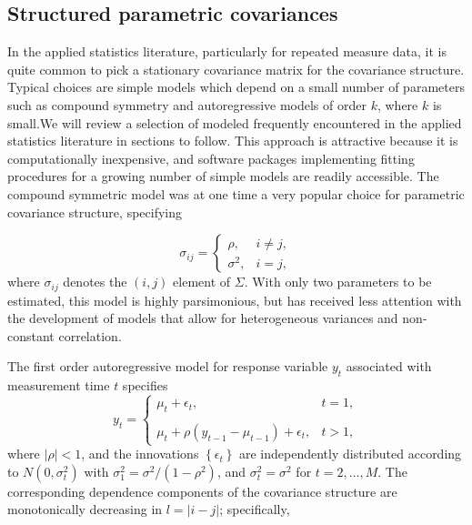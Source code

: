 \subsection{Structured parametric covariances}


In the applied statistics literature, particularly for repeated measure data, it is quite common to pick a stationary covariance matrix for the covariance structure. Typical choices are simple models which depend on a small number of parameters such as compound symmetry and autoregressive models of order $k$, where $k$ is small.We will review a selection of modeled frequently encountered in the applied statistics literature in sections to follow. This approach is attractive because it is computationally inexpensive, and software packages implementing fitting procedures for a growing number of simple models are readily accessible. The compound symmetric model was at one time a very popular choice for parametric covariance structure, specifying

\begin{equation}\label{eq:compound-symmetric-model}
\sigma_{ij} = \left\{ \begin{array}{lr}
\rho, & i \ne j,\\
\sigma^2, & i = j, 
\end{array}\right.
\end{equation}
\noindent
where $\sigma_{ij}$ denotes the $\left(i,j\right)$ element of $\Sigma$. With only two parameters to be estimated, this model is highly parsimonious, but has received less attention with the development of models that allow for heterogeneous variances and non-constant correlation. 

\bigskip

The first order autoregressive model for response variable $y_t$ associated with measurement time $t$ specifies
\begin{equation}\label{eq:ar-1-model}
y_{t} = \left\{ \begin{array}{lr}
\mu_t + \epsilon_t, & t = 1,\\
& \\
\mu_t + \rho\left(y_{t-1} - \mu_{t-1}\right) + \epsilon_t, & t > 1,
\end{array}\right.
\end{equation}
\bigskip
\noindent 
where $\vert \rho \vert < 1$, and the innovations $\left\{\epsilon_t\right\}$ are independently distributed according to $N\left(0,\sigma_t^2\right)$ with $\sigma_1^2 = \sigma^2/\left(1-\rho^2\right)$, and $\sigma_t^2 = \sigma^2$ for $t = 2, \dots, M$. The corresponding dependence components of the covariance structure are monotonically decreasing in $l = \vert i-j \vert$; specifically,


